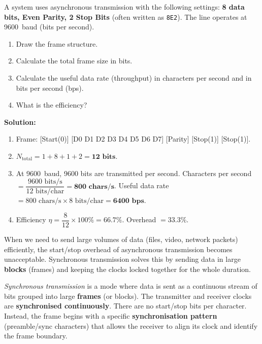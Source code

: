 \documentclass[11pt]{article}
\newcounter{popsec}
\newcounter{popsub}
\newcommand{\courssub}[1]{%
  \stepcounter{popsub}%
  \par\vspace{9pt}\noindent{\popxbold\fontsize{11.5}{13}\selectfont\color{popink}{\color{poporange}\thepopsec.\thepopsub}\hspace{6pt}#1}\par\nopagebreak\vspace{4pt}
}
\begin{document}
\begin{exoresolu}
A system uses asynchronous transmission with the following settings: \textbf{8 data bits, Even Parity, 2 Stop Bits} (often written as \texttt{8E2}). The line operates at \SI{9600}{baud} (bits per second).
\begin{enumerate}
    \item Draw the frame structure.
    \item Calculate the total frame size in bits.
    \item Calculate the useful data rate (throughput) in characters per second and in bits per second (bps).
    \item What is the efficiency?
\end{enumerate}
\tcblower
\textbf{Solution:}
\begin{enumerate}
    \item Frame: [Start(0)] [D0 D1 D2 D3 D4 D5 D6 D7] [Parity] [Stop(1)] [Stop(1)].
    \item $N_{\text{total}} = 1 + 8 + 1 + 2 = \mathbf{12 \text{ bits}}$.
    \item At \SI{9600}{baud}, 9600 bits are transmitted per second.
        Characters per second $= \dfrac{9600 \text{ bits/s}}{12 \text{ bits/char}} = \mathbf{800 \text{ chars/s}}$.
        Useful data rate $= 800 \text{ chars/s} \times 8 \text{ bits/char} = \mathbf{6400 \text{ bps}}$.
    \item Efficiency $\eta = \dfrac{8}{12} \times 100\% = \mathbf{66.7\%}$.
        Overhead $= 33.3\%$.
\end{enumerate}
\end{exoresolu}

\courssub{Synchronous Transmission}

When we need to send large volumes of data (files, video, network packets) efficiently, the start/stop overhead of asynchronous transmission becomes unacceptable. Synchronous transmission solves this by sending data in large \textbf{blocks} (frames) and keeping the clocks locked together for the whole duration.

\begin{definition}
\emph{Synchronous transmission} is a mode where data is sent as a continuous stream of bits grouped into large \textbf{frames} (or blocks). The transmitter and receiver clocks are \textbf{synchronised continuously}. There are no start/stop bits per character. Instead, the frame begins with a specific \textbf{synchronisation pattern} (preamble/sync characters) that allows the receiver to align its clock and identify the frame boundary.
\end{definition}
\end{document}
